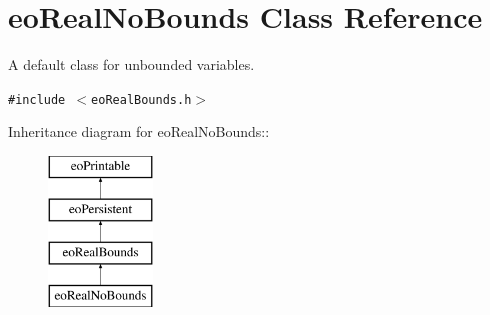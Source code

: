 \section{eo\-Real\-No\-Bounds Class Reference}
\label{classeo_real_no_bounds}
A default class for unbounded variables.  


{\tt \#include $<$eo\-Real\-Bounds.h$>$}

Inheritance diagram for eo\-Real\-No\-Bounds::\begin{figure}[H]
\begin{center}
\leavevmode
\includegraphics[height=4cm]{classeo_real_no_bounds}
\end{center}
\end{figure}

